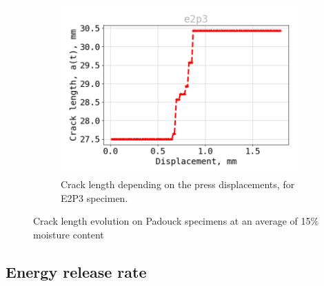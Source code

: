 \begin{figure}[H]
\begin{subfigure}{0.48\linewidth}
	\centering
	\includegraphics[scale=0.3]{Figures/e2p3_a}
	\decoRule
	\caption[Crack length E2P3]{Crack length depending on the press displacements, for E2P3 specimen.}
	\label{fig:E2P3_a}
\end{subfigure}
\caption{Crack length evolution on Padouck specimens at an average of 15\% moisture content}
\label{E2p_a}
\end{figure}
\newpage
\subsection{Energy release rate}

